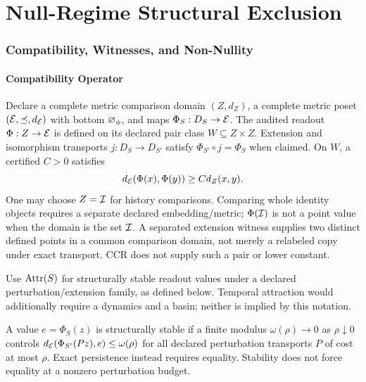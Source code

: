 \part{Null-Regime Structural Exclusion}
\section{Compatibility, Witnesses, and Non-Nullity}

\subsection{Compatibility Operator}
\begin{definition}\label{def:compatibility-operator}
Declare a complete metric comparison domain $(Z,d_Z)$, a complete metric poset $(\mathcal{E},\preceq,d_{\mathcal{E}})$ with bottom $\varnothing_\phi$, and maps $\Phi_S:D_S\to\mathcal{E}$. The audited readout $\Phi:Z\to\mathcal{E}$ is defined on its declared pair class $W\subseteq Z\times Z$. Extension and isomorphism transports $j:D_S\to D_{S'}$ satisfy $\Phi_{S'}\circ j=\Phi_S$ when claimed. On $W$, a certified $C>0$ satisfies
\[
d_{\mathcal{E}}(\Phi(x),\Phi(y))\geq C d_Z(x,y).
\]
One may choose $Z=\mathcal{I}$ for history comparisons. Comparing whole identity objects requires a separate declared embedding/metric; $\Phi(\mathcal{I})$ is not a point value when the domain is the set $\mathcal{I}$. A separated extension witness supplies two distinct defined points in a common comparison domain, not merely a relabeled copy under exact transport. CCR does not supply such a pair or lower constant.
\end{definition}

\begin{definition}\label{def:phenomenological-attractor}
Use $\operatorname{Attr}(S)$ for structurally stable readout values under a declared perturbation/extension family, as defined below. Temporal attraction would additionally require a dynamics and a basin; neither is implied by this notation.
\end{definition}

\begin{definition}\label{def:phenomenological-stability}
A value $e=\Phi_S(z)$ is structurally stable if a finite modulus $\omega(\rho)\to0$ as $\rho\downarrow0$ controls $d_{\mathcal{E}}(\Phi_{S'}(Pz),e)\leq\omega(\rho)$ for all declared perturbation transports $P$ of cost at most $\rho$. Exact persistence instead requires equality. Stability does not force equality at a nonzero perturbation budget.
\end{definition}

